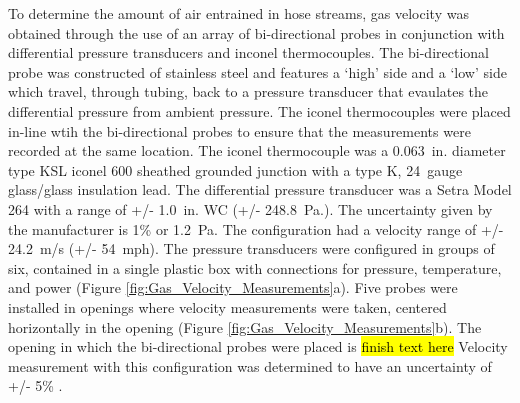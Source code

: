 \documentclass{article}
\begin{document}
To determine the amount of air entrained in hose streams, gas velocity was obtained through the use of an array of bi-directional probes in conjunction with differential pressure transducers and inconel thermocouples. The bi-directional probe was constructed of stainless steel and features a `high' side and a `low' side which travel, through tubing, back to a pressure transducer that evaulates the differential pressure from ambient pressure. The iconel thermocouples were placed in-line wtih the bi-directional probes to ensure that the measurements were recorded at the same location. The iconel thermocouple was a 0.063~in. diameter type KSL iconel 600 sheathed grounded junction with a type K, 24~gauge glass/glass insulation lead. The differential pressure transducer was a Setra Model 264 with a range of +/- 1.0~in. WC (+/- 248.8~Pa.). The uncertainty given by the manufacturer is 1\% or 1.2~Pa. The configuration had a velocity range of +/- 24.2~m/s (+/- 54~mph). The pressure transducers were configured in groups of six, contained in a single plastic box with connections for pressure, temperature, and power (Figure \ref{fig:Gas_Velocity_Measurements}a). Five probes were installed in openings where velocity measurements were taken, centered horizontally in the opening (Figure \ref{fig:Gas_Velocity_Measurements}b). The opening in which the bi-directional probes were placed is \hl{finish text here} Velocity measurement with this configuration was determined to have an uncertainty of +/- 5\% \cite{BDPInPoolFires}.
\end{document}
